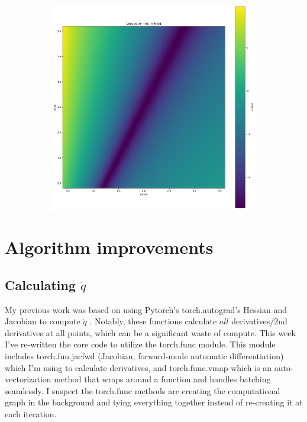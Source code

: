 \documentclass[]{article}
\begin{document}
\begin{figure}[H]
\begin{subfigure}{.5\textwidth}
		\includegraphics[scale=0.20]{loss-landscape-noisy.png}
		\label{subfig:loss-landscape-noisy}
	\end{subfigure}
	\label{fig:loss_noise_no_noise}
	
\end{figure}


\section{Algorithm improvements}

\subsection{Calculating $\ddot{q}$}
My previous work was based on using Pytorch\cite{Paszke2019}'s torch.autograd's Hessian and Jacobian to compute $\ddot{q}$ \cite{Cranmer2020}. Notably, these functions calculate $\textit{all}$ derivatives/2nd derivatives at all points, which can be a significant waste of compute. This week I've re-written the core code to utilize the torch.func module. This module includes torch.fun.jacfwd (Jacobian, forward-mode automatic differentiation) which I'm using to calculate derivatives, and torch.func.vmap which is an auto-vectorization method that wraps around a function and handles batching seamlessly. I suspect the torch.func methods are creating the computational graph in the background and tying everything together instead of re-creating it at each iteration.
\end{document}
